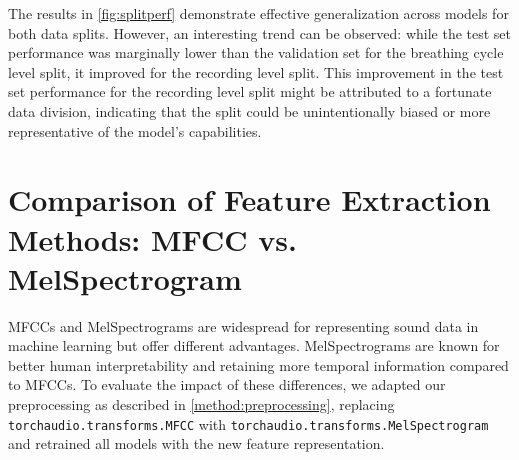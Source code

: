 The results in \autoref{fig:splitperf} demonstrate effective generalization across models for both data splits. However, an interesting trend can be observed: while the test set performance was marginally lower than the validation set for the breathing cycle level split, it improved for the recording level split. This improvement in the test set performance for the recording level split might be attributed to a fortunate data division, indicating that the split could be unintentionally biased or more representative of the model's capabilities.

\section{Comparison of Feature Extraction Methods: MFCC vs. MelSpectrogram}
MFCCs and MelSpectrograms are widespread for representing sound data in machine learning but offer different advantages. MelSpectrograms are known for better human interpretability and retaining more temporal information compared to MFCCs. To evaluate the impact of these differences, we adapted our preprocessing as described in \autoref{method:preprocessing}, replacing \lstinline{torchaudio.transforms.MFCC} with \lstinline{torchaudio.transforms.MelSpectrogram} and retrained all models with the new feature representation.

